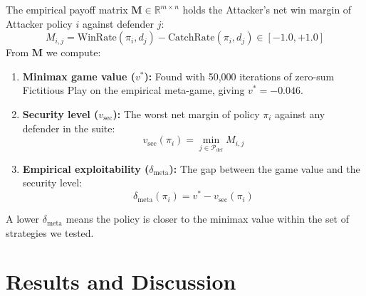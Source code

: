 \documentclass[conference]{IEEEtran}
\begin{document}
The empirical payoff matrix $\bm{M} \in \mathbb{R}^{m \times n}$ holds the Attacker's net win margin of Attacker policy $i$ against defender $j$:
\begin{equation}
M_{i, j} = \text{WinRate}(\pi_i, d_j) - \text{CatchRate}(\pi_i, d_j) \in [-1.0, +1.0]
\end{equation}
From $\bm{M}$ we compute:
\begin{enumerate}
    \item \textbf{Minimax game value ($v^*$):} Found with 50,000 iterations of zero-sum Fictitious Play on the empirical meta-game, giving $v^* = -0.046$.
    \item \textbf{Security level ($v_{\text{sec}}$):} The worst net margin of policy $\pi_i$ against any defender in the suite:
    \begin{equation}
    v_{\text{sec}}(\pi_i) = \min_{j \in \mathcal{P}_{\text{def}}} M_{i, j}
    \end{equation}
    \item \textbf{Empirical exploitability ($\delta_{\text{meta}}$):} The gap between the game value and the security level:
    \begin{equation}
    \delta_{\text{meta}}(\pi_i) = v^* - v_{\text{sec}}(\pi_i)
    \end{equation}
\end{enumerate}
A lower $\delta_{\text{meta}}$ means the policy is closer to the minimax value within the set of strategies we tested.

\section{Results and Discussion}

\begin{table}[t]
\caption{Bridge Crossing Distribution and Route Diversity ($N=150$ Paired Evaluation Seeds)}
\label{tab:bridge_diversity}
\centering
{}
\end{table}
\end{document}
